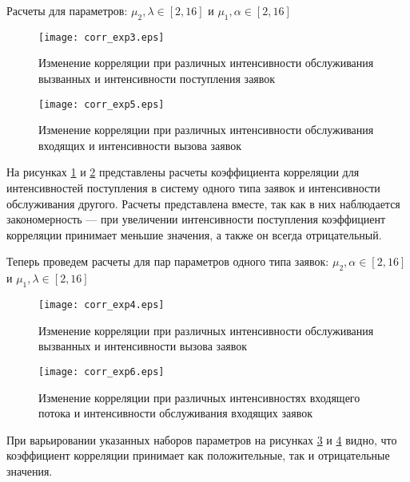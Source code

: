 Расчеты для параметров: $\mu_{2},\lambda \in [2,16]$ и $\mu_{1},\alpha \in [2,16]$
\begin{figure}[H]
	\centering
	\texttt{[image: corr\_exp3.eps]}
	\caption{Изменение корреляции при различных интенсивности обслуживания вызванных и интенсивности поступления заявок}
	\label{exps_corr_exp3}
\end{figure} 

\begin{figure}[H]
	\centering
	\texttt{[image: corr\_exp5.eps]}
	\caption{Изменение корреляции при различных интенсивности обслуживания входящих и интенсивности вызова заявок}
	\label{exps_corr_exp5}
\end{figure} 

На рисунках \ref{exps_corr_exp3} и \ref{exps_corr_exp5} представлены расчеты коэффициента корреляции для интенсивностей поступления в систему одного типа заявок и интенсивности обслуживания другого. Расчеты представлена вместе, так как в них наблюдается закономерность --- при увеличении интенсивности поступления коэффициент корреляции принимает меньшие значения, а также он всегда отрицательный.

Теперь проведем расчеты для пар параметров одного типа заявок: $\mu_{2},\alpha \in [2,16]$ и $\mu_{1},\lambda \in [2,16]$
\begin{figure}[H]
	\centering
	\texttt{[image: corr\_exp4.eps]}
	\caption{Изменение корреляции при различных интенсивности обслуживания вызванных и интенсивности вызова заявок}
	\label{exps_corr_exp4}
\end{figure} 

\begin{figure}[H]
	\centering
	\texttt{[image: corr\_exp6.eps]}
	\caption{Изменение корреляции при различных интенсивностях входящего потока и интенсивности обслуживания входящих заявок}
	\label{exps_corr_exp6}
\end{figure} 

При варьировании указанных наборов параметров на рисунках \ref{exps_corr_exp4} и \ref{exps_corr_exp6} видно, что коэффициент корреляции принимает как положительные, так и отрицательные значения.

